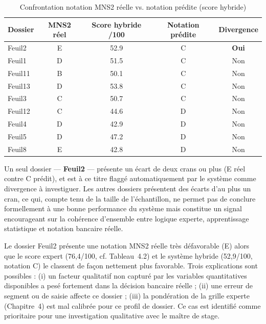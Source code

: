 \begin{table}[h]
\centering
\small
\begin{tabular}{@{}lcccc@{}}
\toprule
\textbf{Dossier} & \textbf{MNS2 réel} & \textbf{Score hybride /100} & \textbf{Notation prédite} & \textbf{Divergence} \\
\midrule
Feuil2  & E & 52.9 & C & \textcolor{bporange}{\textbf{Oui}} \\
Feuil1  & D & 51.5 & C & Non \\
Feuil11 & B & 50.1 & C & Non \\
Feuil13 & D & 53.8 & C & Non \\
Feuil3  & C & 50.7 & C & Non \\
Feuil12 & C & 44.6 & D & Non \\
Feuil4  & D & 42.9 & D & Non \\
Feuil5  & D & 47.2 & D & Non \\
Feuil8  & E & 42.8 & D & Non \\
\bottomrule
\end{tabular}
\caption{Confrontation notation MNS2 réelle vs. notation prédite (score hybride)}
\label{tab:comparaison-mns2}
\end{table}

Un seul dossier — \textbf{Feuil2} — présente un écart de deux crans ou plus (E réel contre C
prédit), et est à ce titre flaggé automatiquement par le système comme divergence à investiguer.
Les autres dossiers présentent des écarts d'au plus un cran, ce qui, compte tenu de la taille de
l'échantillon, ne permet pas de conclure formellement à une bonne performance du système mais
constitue un signal encourageant sur la cohérence d'ensemble entre logique experte, apprentissage
statistique et notation bancaire réelle.

\begin{limite}
Le dossier Feuil2 présente une notation MNS2 réelle très défavorable (E) alors que le score
expert (76,4/100, cf. Tableau~4.2) et le système hybride (52,9/100, notation C) le classent de
façon nettement plus favorable. Trois explications sont possibles : (i) un facteur qualitatif non
capturé par les variables quantitatives disponibles a pesé fortement dans la décision bancaire
réelle ; (ii) une erreur de segment ou de saisie affecte ce dossier ; (iii) la pondération de la
grille experte (Chapitre~4) est mal calibrée pour ce profil de dossier. Ce cas est identifié comme
prioritaire pour une investigation qualitative avec le maître de stage.
\end{limite}

